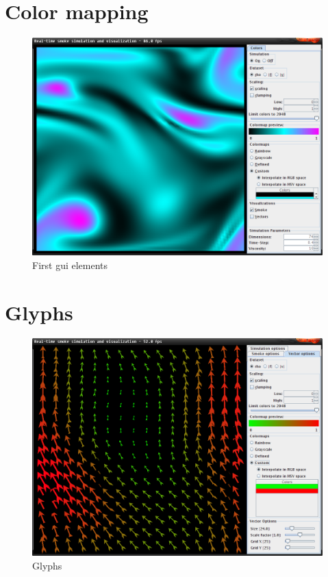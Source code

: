 \documentclass[a4paper,11pt,twoside]{report}
\begin{document}
	\section{Color mapping}
		\begin{figure}[h]
		\centering
		\includegraphics[scale=\imagescalefactor]{images/step2.png}
		\caption{First gui elements}\label{fig:step1}
		\end{figure}
		\newpage
	\section{Glyphs}
		\begin{figure}[h]
		\centering
		\includegraphics[scale=\imagescalefactor]{images/step3.png}
		\caption{Glyphs}\label{fig:step1}
		\end{figure}
		\newpage
\end{document}
